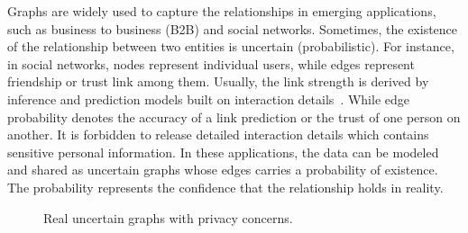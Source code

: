 

Graphs are widely used to capture the relationships in emerging applications, such as business to business (B2B) and social networks. 
Sometimes, the existence of the relationship between two entities is uncertain (probabilistic). For instance, in social networks, nodes represent individual users, while edges represent friendship or trust link among them.  Usually, the link strength is derived by inference and prediction models built on interaction details~\cite{Adar_Managing_2007,Kempe_Maximizing_2003}. While edge probability denotes the accuracy of a link prediction or the trust of one person on another. 
It is forbidden to release detailed interaction details which contains sensitive personal information. 
In these applications, the data can be modeled and shared as uncertain graphs whose edges carries a probability of existence. 
The probability represents the confidence that the relationship holds in reality. 

\begin{figure}[t]
    \vspace{-6pt}
    \caption{Real uncertain graphs with privacy concerns.}
    \vspace{-10pt}
    \label{fig:motivation}
\end{figure} 

